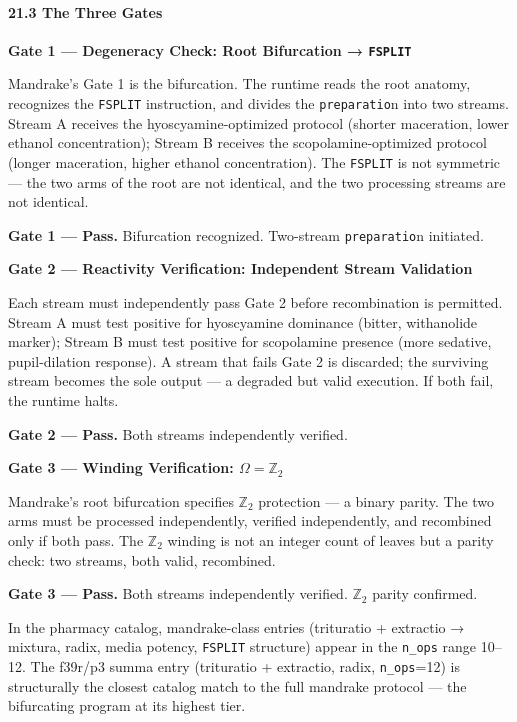 \documentclass[12pt,a4paper]{article}
\begin{document}
\hypertarget{the-three-gates-1}{%
\paragraph{21.3 The Three Gates}\label{the-three-gates-1}}

\textbf{Gate 1 --- Degeneracy Check: Root Bifurcation → \texttt{FSPLIT}}

Mandrake's Gate 1 is the bifurcation. The runtime reads the root
anatomy, recognizes the \texttt{FSPLIT} instruction, and divides the
\texttt{preparatio}n into two streams. Stream A receives the
hyoscyamine-optimized protocol (shorter maceration, lower ethanol
concentration); Stream B receives the scopolamine-optimized protocol
(longer maceration, higher ethanol concentration). The \texttt{FSPLIT}
is not symmetric --- the two arms of the root are not identical, and the
two processing streams are not identical.

\textbf{Gate 1 --- Pass.} Bifurcation recognized. Two-stream
\texttt{preparatio}n initiated.

\textbf{Gate 2 --- Reactivity Verification: Independent Stream
Validation}

Each stream must independently pass Gate 2 before recombination is
permitted. Stream A must test positive for hyoscyamine dominance
(bitter, withanolide marker); Stream B must test positive for
scopolamine presence (more sedative, pupil-dilation response). A stream
that fails Gate 2 is discarded; the surviving stream becomes the sole
output --- a degraded but valid execution. If both fail, the runtime
halts.

\textbf{Gate 2 --- Pass.} Both streams independently verified.

\textbf{Gate 3 --- Winding Verification: \(\Omega = \mathbb{Z}_2\)}

Mandrake's root bifurcation specifies \(\mathbb{Z}_2\) protection --- a
binary parity. The two arms must be processed independently, verified
independently, and recombined only if both pass. The \(\mathbb{Z}_2\)
winding is not an integer count of leaves but a parity check: two
streams, both valid, recombined.

\textbf{Gate 3 --- Pass.} Both streams independently verified.
\(\mathbb{Z}_2\) parity confirmed.

In the pharmacy catalog, mandrake-class entries (trituratio + extractio
→ mixtura, radix, media potency, \texttt{FSPLIT} structure) appear in
the \texttt{n\_ops} range 10--12. The f39r/p3 summa entry (trituratio +
extractio, radix, \texttt{n\_ops}=12) is structurally the closest
catalog match to the full mandrake protocol --- the bifurcating program
at its highest tier.
\end{document}
